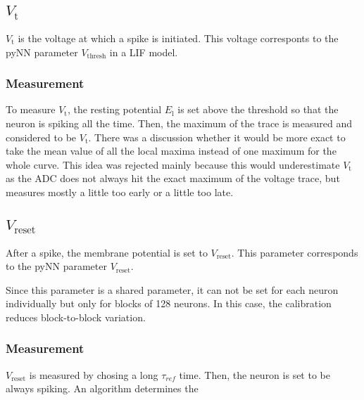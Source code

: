 \documentclass[12pt,a4paper,bibliography=totocnumbered,listof=totocnumbered]{scrartcl}
\begin{document}
\subsection{$V_\text{t}$}
$V_\text{t}$ is the voltage at which a spike is initiated.
This voltage corresponts to the pyNN parameter $V_\text{thresh}$ in a LIF model.

\subsubsection*{Measurement}
To measure $V_\text{t}$, the resting potential $E_\text{l}$ is set above the threshold so that the neuron is spiking all the time.
Then, the maximum of the trace is measured and considered to be $V_\text{t}$.
There was a discussion whether it would be more exact to take the mean value of all the local maxima instead of one maximum for the whole curve.
This idea was rejected mainly because this would underestimate $V_\text{t}$ as the ADC does not always hit the exact maximum of the voltage trace, but measures mostly a little too early or a little too late.

\subsection{$V_\text{reset}$}
After a spike, the membrane potential is set to $V_\text{reset}$.
This parameter corresponds to the pyNN parameter $V_\text{reset}$.

Since this parameter is a shared parameter, it can not be set for each neuron individually but only for blocks of 128 neurons.
In this case, the calibration reduces block-to-block variation.

\subsubsection*{Measurement}
$V_\text{reset}$ is measured by chosing a long $\tau_{ref}$ time.
Then, the neuron is set to be always spiking.
An algorithm determines the 
\end{document}
